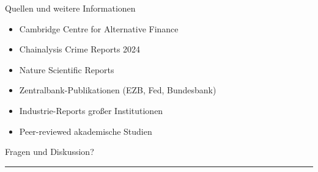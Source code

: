 \documentclass[aspectratio=169,t,9pt]{beamer}
\begin{document}
\begin{frame}{Quellen und weitere Informationen}
    \footnotesize
    \begin{itemize}
        \item Cambridge Centre for Alternative Finance
        \item Chainalysis Crime Reports 2024
        \item Nature Scientific Reports
        \item Zentralbank-Publikationen (EZB, Fed, Bundesbank)
        \item Industrie-Reports großer Institutionen
        \item Peer-reviewed akademische Studien
    \end{itemize}
    
    \vspace{1em}
    \begin{center}
        \textcolor{bitcoinorange}{\Large Fragen und Diskussion?}
        \\[1em]
        \textcolor{bitcoinorange}{\rule{0.5\textwidth}{2pt}}
    \end{center}
\end{frame}
\end{document}
